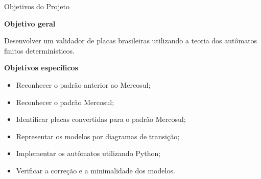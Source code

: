 \documentclass[aspectratio=169,12pt]{beamer}
\begin{document}
\begin{frame}{Objetivos do Projeto}

    \textbf{Objetivo geral}

    Desenvolver um validador de placas brasileiras utilizando
    a teoria dos autômatos finitos determinísticos.

    \vspace{0.4cm}

    \textbf{Objetivos específicos}

    \begin{itemize}
        \item Reconhecer o padrão anterior ao Mercosul;
        \item Reconhecer o padrão Mercosul;
        \item Identificar placas convertidas para o padrão Mercosul;
        \item Representar os modelos por diagramas de transição;
        \item Implementar os autômatos utilizando Python;
        \item Verificar a correção e a minimalidade dos modelos.
    \end{itemize}

\end{frame}

\end{document}
